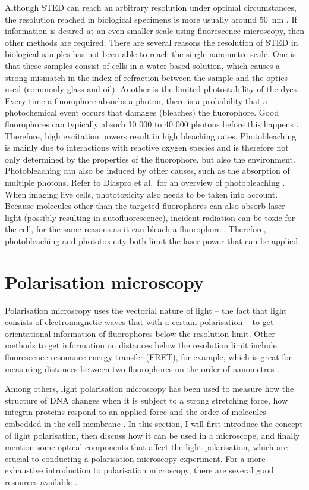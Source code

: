 Although STED can reach an arbitrary resolution under optimal circumstances, the resolution reached in biological specimens is more usually around 50~nm \cite{Wildanger2012,Muller2012}. If information is desired at an even smaller scale using fluorescence microscopy, then other methods are required.
There are several reasons the resolution of STED in biological samples has not been able to reach the single-nanometre scale. One is that these samples consist of cells in a water-based solution, which causes a strong mismatch in the index of refraction between the sample and the optics used (commonly glass and oil). Another is the limited photostability of the dyes. Every time a fluorophore absorbs a photon, there is a probability that a photochemical event occurs that damages (bleaches) the fluorophore. Good fluorophores can typically absorb 10 000 to 40 000 photons before this happens \cite{Lichtman2005}. Therefore, high excitation powers result in high bleaching rates. Photobleaching is mainly due to interactions with reactive oxygen species and is therefore not only determined by the properties of the fluorophore, but also the environment. Photobleaching can also be induced by other causes, such as the absorption of multiple photons. Refer to Diaspro et al.~for an overview of photobleaching \cite{Diaspro2006}. When imaging live cells, phototoxicity also needs to be taken into account. Because molecules other than the targeted fluorophores can also absorb laser light (possibly resulting in autofluorescence), incident radiation can be toxic for the cell, for the same reasons as it can bleach a fluorophore \cite{Lichtman2005}. Therefore, photobleaching and phototoxicity both limit the laser power that can be applied.


\section{Polarisation microscopy}

Polarisation microscopy uses the vectorial nature of light -- the fact that light consists of electromagnetic waves that with a certain polarisation -- to get orientational information of fluorophores below the resolution limit. Other methods to get information on distances below the resolution limit  include fluorescence resonance energy transfer (FRET), for example, which is great for measuring distances between two fluorophores on the order of nanometres \cite{Lerner2021}.

Among others, light polarisation microscopy has been used to measure how the structure of DNA changes when it is subject to a strong stretching force, how integrin proteins respond to an applied force and the order of molecules embedded in the cell membrane \cite{Backer2019, Nordenfelt2017, Swaminathan2017, Brasselet2013}. In this section, I will first introduce the concept of light polarisation, then discuss how it can be used in a microscope, and finally mention some optical components that affect the light polarisation, which are crucial to conducting a polarisation microscopy experiment. For a more exhaustive introduction to polarisation microscopy, there are several good resources available \cite{Goldstein2011, Collett2005, Lakowicz2006}.

